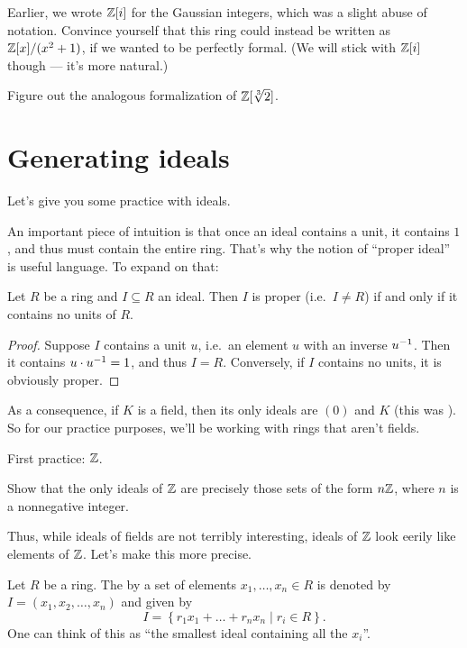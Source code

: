 \begin{exercise}
	Earlier, we wrote $\mathbb Z[i]$ for the Gaussian integers,
	which was a slight abuse of notation.
	Convince yourself that this ring
	could instead be written as $\mathbb Z[x] / (x^2+1)$,
	if we wanted to be perfectly formal.
	(We will stick with $\mathbb Z[i]$ though --- it's more natural.)

	Figure out the analogous formalization of $\mathbb Z[\sqrt[3]{2}]$.
\end{exercise}

\section{Generating ideals}

Let's give you some practice with ideals.

An important piece of intuition is that once an ideal
contains a unit, it contains $1$, and
thus must contain the entire ring.
That's why the notion of ``proper ideal''
is useful language.
To expand on that:
\begin{proposition}
	Let $R$ be a ring and $I \subseteq R$ an ideal.
	Then $I$ is proper (i.e.\ $I \ne R$)
	if and only if it contains no units of $R$.
\end{proposition}
\begin{proof}
	Suppose $I$ contains a unit $u$, i.e.\ an element $u$
	with an inverse $u^{-1}$.
	Then it contains $u \cdot u^{-1} = 1$, and thus $I = R$.
	Conversely, if $I$ contains no units, it is obviously proper.
\end{proof}
As a consequence, if $K$ is a field,
then its only ideals are $(0)$ and $K$
(this was ).
So for our practice purposes, we'll be working with rings that aren't fields.

First practice: $\mathbb Z$.
\begin{exercise}
	Show that the only ideals of $\mathbb Z$ are precisely those
	sets of the form $n\mathbb Z$, where $n$ is a nonnegative integer.
\end{exercise}

Thus, while ideals of fields are not terribly interesting,
ideals of $\mathbb Z$ look eerily like elements of $\mathbb Z$.
Let's make this more precise.
\begin{definition}
	Let $R$ be a ring.
	The  by a set of elements $x_1, \dots, x_n \in R$
	is denoted by $I = (x_1, x_2, \dots, x_n)$
	and given by
	\[ I = \left\{ r_1 x_1 + \dots + r_n x_n \mid r_i \in R \right\}.  \]
	One can think of this as ``the smallest ideal containing all the $x_i$''.
\end{definition}

